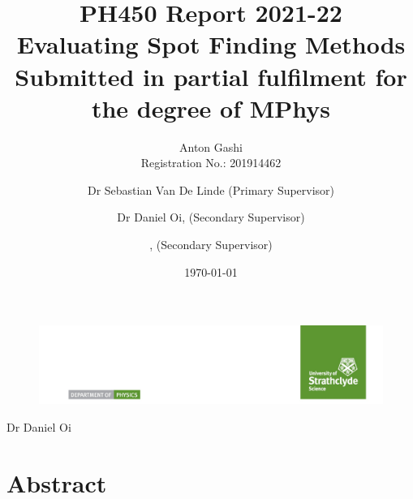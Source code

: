 \documentclass[aps,pra,a4paper,nofootinbib,onecolumn,tightenlines,longbibliography,12pt,amsfonts,amssymb,amsmath,floatfix]{revtex4-2} %
\newcommand{\projecttitle}{Evaluating Spot Finding Methods}%
\newcommand{\studentname}{Anton Gashi}%
\newcommand{\regnumber}{201914462}
\newcommand{\degree}{MPhys}
\newcommand{\primarysup}{Dr Sebastian Van De Linde}
\newcommand{\secondsup}{Dr Daniel Oi}%
\begin{document}

\begin{figure}
\includegraphics[width=\textwidth]{ScienceLogo.png}
\end{figure}

\title{PH450 Report 2021-22\\ \vspace{1cm}
{\huge \projecttitle}\\[0.5cm] %
{\footnotesize Submitted in partial fulfilment for the degree of \degree}}

\author{\studentname\\
Registration No.: \regnumber}

\author{\primarysup{} (Primary Supervisor)}
\noaffiliation
\ifdefined\secondsup %
\author{\secondsup, (Secondary Supervisor)} %
\noaffiliation
\fi
\ifdefined\thirdsup
\author{\thirdsup, (Secondary Supervisor)} %
\noaffiliation
\fi

\date{\today}


\maketitle

\newpage %


\section*{Abstract} %
\end{document}
